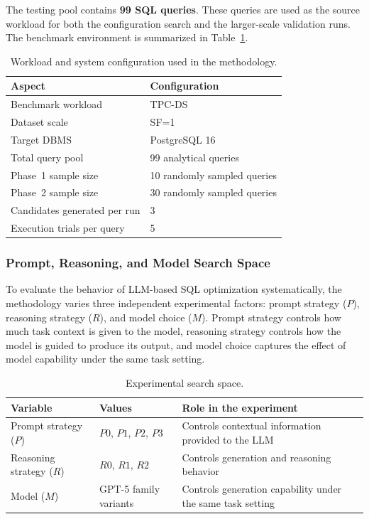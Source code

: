 The testing pool contains \textbf{99 SQL queries}. These queries are used as the source workload for both the configuration search and the larger-scale validation runs. The benchmark environment is summarized in Table~\ref{tab:method-workload}.

\begin{table}[htbp]
\centering
\caption{Workload and system configuration used in the methodology.}
\label{tab:method-workload}
\begin{tabular}{|l|l|}
\textbf{Aspect} & \textbf{Configuration} \\
\hline
Benchmark workload & TPC-DS \\
Dataset scale & SF=1 \\
Target DBMS & PostgreSQL 16 \\
Total query pool & 99 analytical queries \\
Phase~1 sample size & 10 randomly sampled queries \\
Phase~2 sample size & 30 randomly sampled queries \\
Candidates generated per run & 3 \\
Execution trials per query & 5 \\
\hline
\end{tabular}
\end{table}

\subsubsection{Prompt, Reasoning, and Model Search Space}

To evaluate the behavior of LLM-based SQL optimization systematically, the methodology varies three independent experimental factors: prompt strategy ($P$), reasoning strategy ($R$), and model choice ($M$). Prompt strategy controls how much task context is given to the model, reasoning strategy controls how the model is guided to produce its output, and model choice captures the effect of model capability under the same task setting.

\begin{table}[htbp]
\centering
\caption{Experimental search space.}
\label{tab:method-search-space}
\begin{tabular}{|l|l|l|}
\textbf{Variable} & \textbf{Values} & \textbf{Role in the experiment} \\
\hline
Prompt strategy ($P$) & $P0$, $P1$, $P2$, $P3$ & Controls contextual information provided to the LLM \\
Reasoning strategy ($R$) & $R0$, $R1$, $R2$ & Controls generation and reasoning behavior \\
Model ($M$) & GPT-5 family variants & Controls generation capability under the same task setting \\
\hline
\end{tabular}
\end{table}

